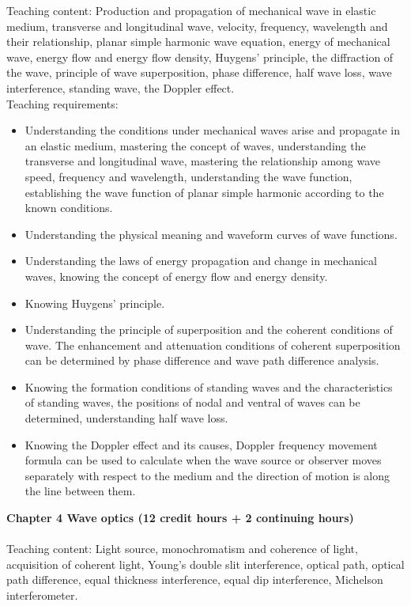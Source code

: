 \documentclass[10pt,a4paper,oneside]{article}
\begin{document}
Teaching content: Production and propagation of mechanical wave in elastic medium, transverse  and longitudinal wave, velocity, frequency, wavelength and their relationship, planar simple harmonic wave equation, energy of  mechanical wave, energy flow and energy flow density, Huygens' principle, the diffraction of the wave, principle of wave superposition, phase difference, half wave loss, wave interference, standing wave, the Doppler effect.\\

Teaching requirements:
\begin{itemize}
	\item Understanding the conditions under mechanical waves arise and propagate in an elastic medium, mastering the concept of waves, understanding the transverse  and longitudinal wave, mastering the relationship among wave speed, frequency and wavelength, understanding the wave function, establishing the wave function of planar simple harmonic according to the known conditions.
	\item Understanding the physical meaning and waveform curves of wave functions.
	\item Understanding the laws of energy propagation and change in mechanical waves, knowing the concept of energy flow and energy density.
	\item Knowing Huygens' principle.
	\item Understanding the principle of superposition and the coherent conditions of wave. The enhancement and attenuation conditions of coherent superposition can be determined by phase difference and wave path difference analysis.
	\item Knowing the formation conditions of standing waves and the characteristics of standing waves, the positions of nodal and ventral of waves can be determined, understanding half wave loss.
	\item Knowing the Doppler effect and its causes, Doppler frequency movement formula can be used to calculate when the wave source or observer moves separately with respect to the medium and the direction of motion is along the line between them.
\end{itemize}
{\bfseries Chapter 4 Wave optics (12 credit hours + 2 continuing hours)}\\

\\

Teaching content: Light source, monochromatism and coherence of light, acquisition of coherent light, Young's double slit interference, optical path, optical path difference, equal thickness interference, equal dip interference, Michelson interferometer.\\
\end{document}

